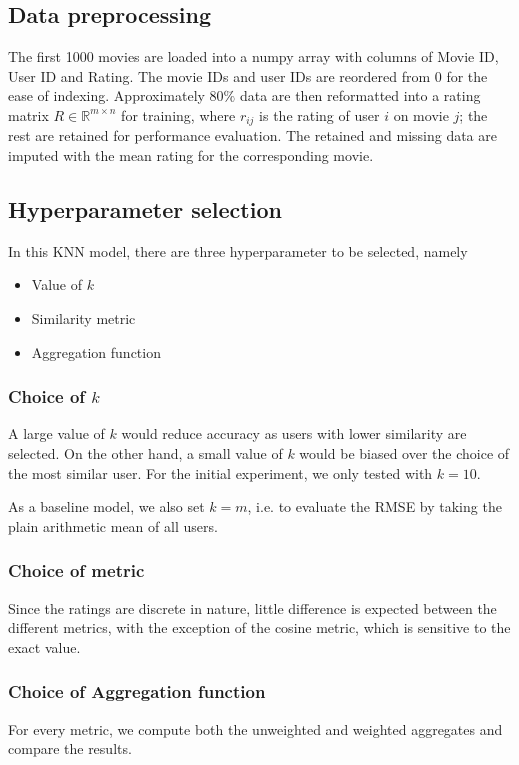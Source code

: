 \documentclass[final]{cvpr}
\begin{document}
\subsection{Data preprocessing}
The first 1000 movies are loaded into a numpy array with columns of Movie ID, User ID and Rating.
The movie IDs and user IDs are reordered from 0 for the ease of indexing.
Approximately $80\%$ data are then reformatted into a rating matrix $R \in \mathbb R^{m \times n}$ for training,
where $r_{ij}$ is the rating of user $i$ on movie $j$;
the rest are retained for performance evaluation.
The retained and missing data are imputed with the mean rating for the corresponding movie.

\subsection{Hyperparameter selection}
In this KNN model, there are three hyperparameter to be selected, namely
\begin{itemize}
	\item Value of $k$
	\item Similarity metric
	\item Aggregation function
\end{itemize}

\subsubsection{Choice of $k$}
A large value of $k$ would reduce accuracy as users with lower similarity are selected.
On the other hand, a small value of $k$ would be biased over the choice of the most similar user.
For the initial experiment, we only tested with $k=10$.

As a baseline model, we also set $k=m$, i.e.
to evaluate the RMSE by taking the plain arithmetic mean of all users.

\subsubsection{Choice of metric}
Since the ratings are discrete in nature,
little difference is expected between the different metrics,
with the exception of the cosine metric,
which is sensitive to the exact value.

\subsubsection{Choice of Aggregation function}
For every metric, we compute both the unweighted and weighted aggregates and compare the results.
\end{document}
